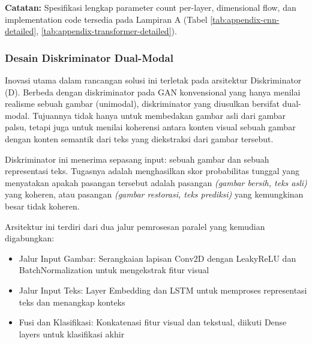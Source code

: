 \documentclass[12pt,a4paper]{article}
\begin{document}
\textbf{Catatan:} Spesifikasi lengkap parameter count per-layer, dimensional flow, dan implementation code tersedia pada Lampiran A (Tabel \ref{tab:appendix-cnn-detailed}, \ref{tab:appendix-transformer-detailed}).

\subsubsection{Desain Diskriminator Dual-Modal} %

Inovasi utama dalam rancangan solusi ini terletak pada arsitektur Diskriminator (D). Berbeda dengan diskriminator pada GAN konvensional yang hanya menilai realisme sebuah gambar (unimodal), diskriminator yang diusulkan bersifat dual-modal. Tujuannya tidak hanya untuk membedakan gambar asli dari gambar palsu, tetapi juga untuk menilai koherensi antara konten visual sebuah gambar dengan konten semantik dari teks yang diekstraksi dari gambar tersebut.

Diskriminator ini menerima sepasang input: sebuah gambar dan sebuah representasi teks. Tugasnya adalah menghasilkan skor probabilitas tunggal yang menyatakan apakah pasangan tersebut adalah pasangan \textit{(gambar bersih, teks asli)} yang koheren, atau pasangan \textit{(gambar restorasi, teks prediksi)} yang kemungkinan besar tidak koheren.

Arsitektur ini terdiri dari dua jalur pemrosesan paralel yang kemudian digabungkan:

\begin{itemize}
    \item Jalur Input Gambar: Serangkaian lapisan Conv2D dengan LeakyReLU dan BatchNormalization untuk mengekstrak fitur visual
    \item Jalur Input Teks: Layer Embedding dan LSTM untuk memproses representasi teks dan menangkap konteks
    \item Fusi dan Klasifikasi: Konkatenasi fitur visual dan tekstual, diikuti Dense layers untuk klasifikasi akhir
\end{itemize}
\end{document}
